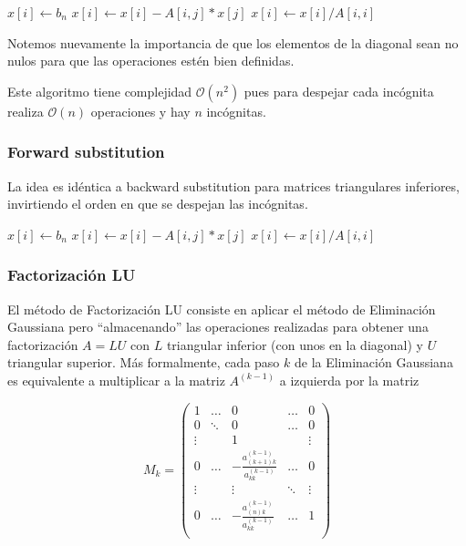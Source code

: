 \begin{algorithmic}
  \State $x[i] \gets b_n$
   \State $x[i] \gets x[i] - A[i,j]*x[j]$
  \EndFor
  \State $x[i] \gets x[i] / A[i, i]$
 \EndFor
\end{algorithmic}

Notemos nuevamente la importancia de que los elementos de la diagonal sean no nulos para que las operaciones estén bien definidas.

Este algoritmo tiene complejidad $\mathcal{O}(n^2)$ pues para despejar cada incógnita realiza $\mathcal{O}(n)$ operaciones y hay $n$ incógnitas.

\subsubsection{Forward substitution}
La idea es idéntica a backward substitution para matrices triangulares inferiores, invirtiendo el orden en que se despejan las incógnitas.

\begin{algorithmic}
  \State $x[i] \gets b_n$
   \State $x[i] \gets x[i] - A[i,j]*x[j]$
  \EndFor
  \State $x[i] \gets x[i] / A[i, i]$
 \EndFor
\end{algorithmic}

\subsubsection{Factorización LU}

El método de Factorización LU consiste en aplicar el método de Eliminación Gaussiana pero ``almacenando'' las operaciones realizadas para obtener una factorización $A = LU$ con $L$ triangular inferior (con unos en la diagonal) y $U$ triangular superior. Más formalmente, cada paso $k$ de la Eliminación Gaussiana es equivalente a multiplicar a la matriz $A^{(k-1)}$ a izquierda por la matriz

\[
M_k = 
\begin{pmatrix} 
1 		& \ldots 	& 0 				& \ldots 	& 0 \\
0 		& \ddots 	& 0 				& \ldots 	& 0 \\
\vdots 	& 			& 1 				& 			& \vdots\\
0		& \ldots		& -\frac{a_{(k+1)k}^{(k - 1)}}{a_{kk}^{(k - 1)}} 	& \ldots		& 0\\
\vdots	& 			& \vdots		 	& \ddots		& \vdots\\
0		& \ldots		& -\frac{a_{(n)k}^{(k - 1)}}{a_{kk}^{(k - 1)}}	& \ldots		& 1\\
\end{pmatrix}
\]

